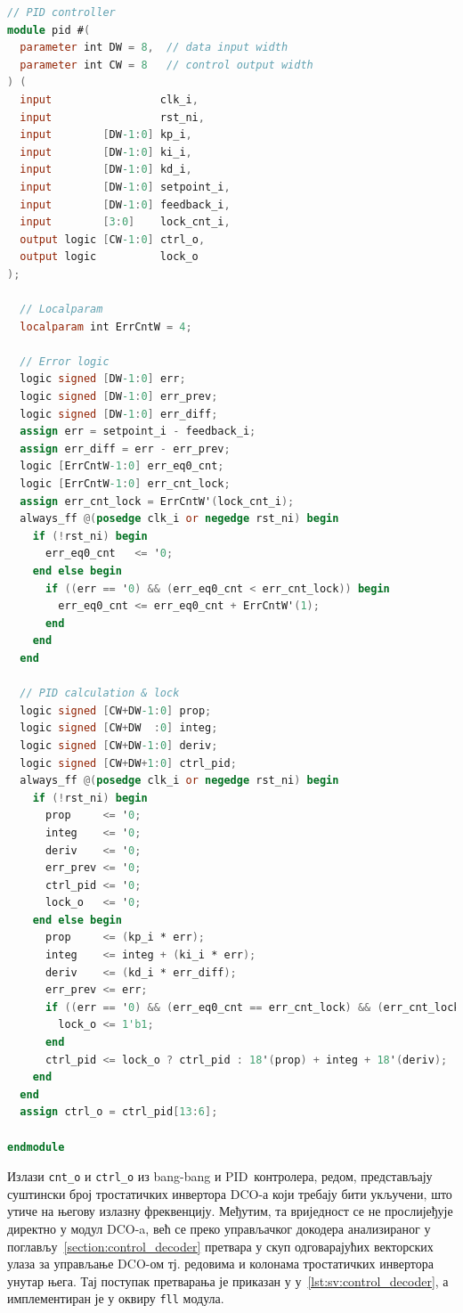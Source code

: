 \documentclass[master]{finthesis}
\newcommand*{\prog}[1]{\texttt{#1}}
\def \DCO  {DCO} %
\def \PID  {PID} %
\begin{document}
\begin{lstlisting}[language=Verilog, caption={Имплементација \PID\ контролера.}, label={lst:sv:pid}]
// PID controller
module pid #(
  parameter int DW = 8,  // data input width
  parameter int CW = 8   // control output width
) (
  input                 clk_i,
  input                 rst_ni,
  input        [DW-1:0] kp_i,
  input        [DW-1:0] ki_i,
  input        [DW-1:0] kd_i,
  input        [DW-1:0] setpoint_i,
  input        [DW-1:0] feedback_i,
  input        [3:0]    lock_cnt_i,
  output logic [CW-1:0] ctrl_o,
  output logic          lock_o
);

  // Localparam
  localparam int ErrCntW = 4;

  // Error logic
  logic signed [DW-1:0] err;
  logic signed [DW-1:0] err_prev;
  logic signed [DW-1:0] err_diff;
  assign err = setpoint_i - feedback_i;
  assign err_diff = err - err_prev;
  logic [ErrCntW-1:0] err_eq0_cnt;
  logic [ErrCntW-1:0] err_cnt_lock;
  assign err_cnt_lock = ErrCntW'(lock_cnt_i);
  always_ff @(posedge clk_i or negedge rst_ni) begin
    if (!rst_ni) begin
      err_eq0_cnt   <= '0;
    end else begin
      if ((err == '0) && (err_eq0_cnt < err_cnt_lock)) begin
        err_eq0_cnt <= err_eq0_cnt + ErrCntW'(1);
      end
    end
  end

  // PID calculation & lock
  logic signed [CW+DW-1:0] prop;
  logic signed [CW+DW  :0] integ;
  logic signed [CW+DW-1:0] deriv;
  logic signed [CW+DW+1:0] ctrl_pid;
  always_ff @(posedge clk_i or negedge rst_ni) begin
    if (!rst_ni) begin
      prop     <= '0;
      integ    <= '0;
      deriv    <= '0;
      err_prev <= '0;
      ctrl_pid <= '0;
      lock_o   <= '0;
    end else begin
      prop     <= (kp_i * err);
      integ    <= integ + (ki_i * err);
      deriv    <= (kd_i * err_diff);
      err_prev <= err;
      if ((err == '0) && (err_eq0_cnt == err_cnt_lock) && (err_cnt_lock != '0)) begin
        lock_o <= 1'b1;
      end
      ctrl_pid <= lock_o ? ctrl_pid : 18'(prop) + integ + 18'(deriv);
    end
  end
  assign ctrl_o = ctrl_pid[13:6];

endmodule
\end{lstlisting}
Излази \prog{cnt\_o} и \prog{ctrl\_o} из bang-bang и \PID\ контролера, редом, представљају суштински број тростатичких инвертора \DCO-а који требају бити укључени, што утиче на његову излазну фреквенцију. Међутим, та вриједност се не прослијеђује директно у модул \DCO-a, већ се преко управљачког докодера анализираног у поглављу~\ref{section:control_decoder} претвара у скуп одговарајућих векторских улаза за управљање \DCO-ом тј. редовима и колонама тростатичких инвертора унутар њега. Тај поступак претварања је приказан у \lstlistingname{у}~\ref{lst:sv:control_decoder}, а имплементиран је у оквиру \prog{fll} модула. \par
\end{document}
